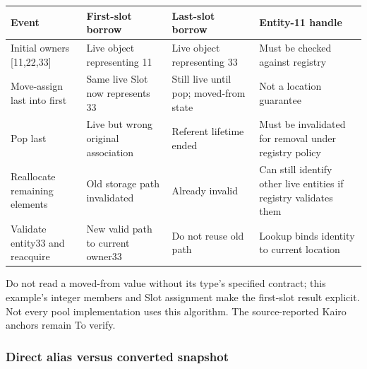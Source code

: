 {\def\LTcaptype{none} %
\begin{longtable}[]{@{}
  >{\raggedright\arraybackslash}p{}
  >{\raggedright\arraybackslash}p{}
  >{\raggedright\arraybackslash}p{}
  >{\raggedright\arraybackslash}p{}@{}}
\toprule\noalign{}
\begin{minipage}[b]{\linewidth}\raggedright
Event
\end{minipage} & \begin{minipage}[b]{\linewidth}\raggedright
First-slot borrow
\end{minipage} & \begin{minipage}[b]{\linewidth}\raggedright
Last-slot borrow
\end{minipage} & \begin{minipage}[b]{\linewidth}\raggedright
Entity-11 handle
\end{minipage} \\
\midrule\noalign{}
\endhead
\bottomrule\noalign{}
\endlastfoot
Initial owners {[}11,22,33{]} & Live object representing 11 & Live object representing 33 & Must be checked against registry \\
Move-assign last into first & Same live Slot now represents 33 & Still live until pop; moved-from state & Not a location guarantee \\
Pop last & Live but wrong original association & Referent lifetime ended & Must be invalidated for removal under registry policy \\
Reallocate remaining elements & Old storage path invalidated & Already invalid & Can still identify other live entities if registry validates them \\
Validate entity33 and reacquire & New valid path to current owner33 & Do not reuse old path & Lookup binds identity to current location \\
\end{longtable}
}

Do not read a moved-from value without its type's specified contract; this example's integer members and Slot assignment make the first-slot result explicit. Not every pool implementation uses this algorithm. The source-reported Kairo anchors remain To verify.

\subsubsection{Direct alias versus converted snapshot}\label{appendix-92ff77d4dfdc-direct-alias-versus-converted-snapshot}

